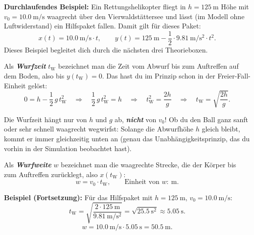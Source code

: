 \documentclass[addpoints,11pt,a4paper]{exam}
\begin{document}
\begin{theoriebox}
\textbf{Durchlaufendes Beispiel:} Ein Rettungshelikopter fliegt in
$h=\SI{125}{\meter}$ Höhe mit $v_0=\SI{10.0}{\meter\per\second}$ waagrecht
über den Vierwaldstättersee und lässt (im Modell ohne Luftwiderstand) ein
Hilfspaket fallen. Damit gilt für dieses Paket:
\[
  x(t) = \SI{10.0}{\meter\per\second}\cdot t, \qquad y(t) = \SI{125}{\meter} - \frac{1}{2}\cdot\SI{9.81}{\meter\per\second\squared}\cdot t^2.
\]
Dieses Beispiel begleitet dich durch die nächsten drei Theorieboxen.
\end{theoriebox}

\begin{theoriebox}
Als \textbf{\emph{Wurfzeit}} $t_{\text{W}}$ bezeichnet man die Zeit vom
Abwurf bis zum Auftreffen auf dem Boden, also bis $y(t_{\text{W}})=0$.
Das hast du im Prinzip schon in der Freier-Fall-Einheit gelöst:
\[
  0 = h - \frac{1}{2}\,g\,t_{\text{W}}^2 \quad\Longrightarrow\quad \frac{1}{2}\,g\,t_{\text{W}}^2 = h \quad\Longrightarrow\quad t_{\text{W}}^2 = \frac{2h}{g} \quad\Longrightarrow\quad \boxed{t_{\text{W}} = \sqrt{\frac{2h}{g}}}.
\]

\begin{hinweisbox}
Die Wurfzeit hängt nur von $h$ und $g$ ab, \textbf{\emph{nicht}} von $v_0$!
Ob du den Ball ganz sanft oder sehr schnell waagrecht wegwirfst: Solange
die Abwurfhöhe $h$ gleich bleibt, kommt er immer gleichzeitig unten an
(genau das Unabhängigkeitsprinzip, das du vorhin in der Simulation
beobachtet hast).
\end{hinweisbox}

Als \textbf{\emph{Wurfweite}} $w$ bezeichnet man die waagrechte Strecke,
die der Körper bis zum Auftreffen zurücklegt, also $x(t_{\text{W}})$:
\[
  \boxed{w = v_0 \cdot t_{\text{W}}}, \qquad \text{Einheit von } w\colon\ \si{\meter}.
\]

\textbf{Beispiel (Fortsetzung):} Für das Hilfspaket mit
$h=\SI{125}{\meter}$, $v_0=\SI{10.0}{\meter\per\second}$:
\[
  t_{\text{W}} = \sqrt{\frac{2\cdot\SI{125}{\meter}}{\SI{9.81}{\meter\per\second\squared}}} = \sqrt{\SI{25.5}{\second\squared}} \approx \SI{5.05}{\second}.
\]
\[
  w = \SI{10.0}{\meter\per\second}\cdot\SI{5.05}{\second} = \SI{50.5}{\meter}.
\]
\end{theoriebox}
\end{document}
